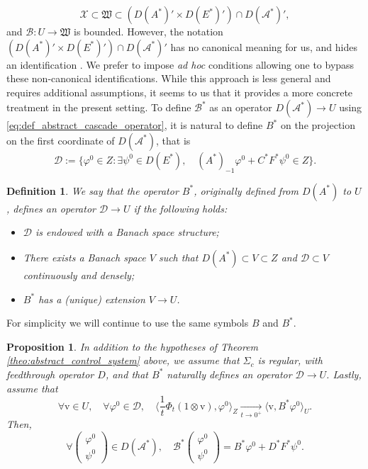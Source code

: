 \documentclass[10pt]{article}
\newtheorem{Proposition}[Theorem]{Proposition}
\newtheorem{Definition}[Theorem]{Definition}
\begin{document}
\[
\mathcal{X} \subset \mathfrak{W} \subset (D(A^*)' \times D(E^*)') \cap D(\mathcal{A}^*)',
\]
and $\mathcal{B} : U \to \mathfrak{W}$ is bounded. However, the notation $(D(A^*)' \times D(E^*)') \cap D(\mathcal{A}^*)'$ has no canonical meaning for us, and hides an identification \cite[eq. 7.10]{weiss_feedback}. We prefer to impose \textit{ad hoc} conditions allowing one to bypass  these non-canonical identifications. While this approach is less general and requires additional assumptions, it seems to us that it provides a more concrete treatment in the present setting.
\newline
\newline
To define $\mathcal{B}^*$ as an operator $D(\mathcal{A}^*) \to U$ using \eqref{eq:def_abstract_cascade_operator}, it is natural to define $B^*$ on the projection on the first coordinate of $D(\mathcal{A}^*)$, that is  
\begin{equation}\label{eq:def_cal_D}
\mathcal{D} := \{ \varphi^0 \in Z : \exists \psi^0 \in D(E^*),\quad (A^*)_{-1} \varphi^0 + C^*F^*\psi^0 \in Z \}.
\end{equation}
\begin{Definition}\label{def:natural_extension}
We say that the operator $B^*$, originally defined from $D(A^*)$ to $U$, defines an operator $\mathcal{D} \to U$ if the following holds: 
\begin{itemize}
\item $\mathcal{D}$ is endowed with a Banach space structure;
\item There exists a Banach space $V$ such that $D(A^*) \subset V \subset Z$ and $\mathcal{D} \subset V$ continuously and densely;
\item $B^*$ has a (unique) extension $V \to U$.
\end{itemize}
\end{Definition}
For simplicity we will continue to use the same symbols $B$ and $B^*$. 
\begin{Proposition}\label{prop:identification_control_operator}
In addition to the hypotheses of Theorem \ref{theo:abstract_control_system} above, we assume that $\Sigma_c$ is regular, with feedthrough operator $D$, and that $B^*$ naturally defines an operator $\mathcal{D} \to U$. Lastly, assume that 
\begin{equation}\label{eq:lim_zero_force}
\forall \mathrm{v} \in U,\quad \forall \varphi^0 \in \mathcal{D},\quad \langle \frac{1}{t} \Phi_t (1 \otimes \mathrm{v}) , \varphi^0 \rangle_Z \xrightarrow[t \to 0^+]{} \langle \mathrm{v} , B^* \varphi^0 \rangle_U.
\end{equation}
Then, 
\[
\forall \left( \begin{array}{c}
\varphi^0 \\
\psi^0
\end{array} \right) \in D(\mathcal{A}^*),\quad \mathcal{B}^* \left( \begin{array}{c}
\varphi^0 \\
\psi^0
\end{array} \right) = B^* \varphi^0 + D^*F^*\psi^0. 
\]
\end{Proposition}
\end{document}
